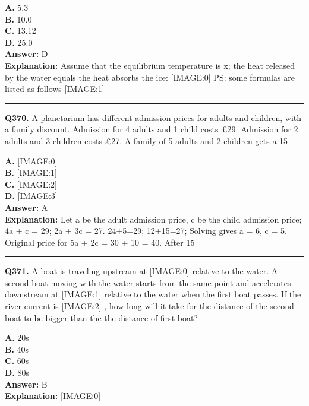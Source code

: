 \documentclass[12pt]{article}
\begin{document}
\textbf{A.} 5.3 \\
\textbf{B.} 10.0 \\
\textbf{C.} 13.12 \\
\textbf{D.} 25.0 \\

\textbf{Answer:} D \\
\textbf{Explanation:} Assume that the equilibrium temperature is x; the heat released by the water equals the heat absorbs the ice:
[IMAGE:0]
PS: some formulas are listed as follows
[IMAGE:1]

\hrule
\vspace{1em}


\noindent
\textbf{Q370.} A planetarium has different admission prices for adults and children, with a family discount.
Admission for 4 adults and 1 child costs £29.
Admission for 2 adults and 3 children costs £27.
A family of 5 adults and 2 children gets a 15%



\textbf{A.} [IMAGE:0] \\
\textbf{B.} [IMAGE:1] \\
\textbf{C.} [IMAGE:2] \\
\textbf{D.} [IMAGE:3] \\

\textbf{Answer:} A \\
\textbf{Explanation:} Let a be the adult admission price, c be the child admission price;
4a + c = 29; 2a + 3c = 27.
24+5=29; 12+15=27;
Solving gives a = 6, c = 5.
Original price for 5a + 2c = 30 + 10 = 40.
After 15%

\hrule
\vspace{1em}


\noindent
\textbf{Q371.} A boat is traveling upstream at
[IMAGE:0]
relative to the water. A second boat moving with the water starts from the same point and accelerates downstream at
[IMAGE:1]
relative to the water when the first boat passes. If the river current is
[IMAGE:2]
, how long will it take for the distance of the second boat to be bigger than the the distance of first boat?



\textbf{A.} 20s \\
\textbf{B.} 40s \\
\textbf{C.} 60s \\
\textbf{D.} 80s \\

\textbf{Answer:} B \\
\textbf{Explanation:} [IMAGE:0]
\end{document}
